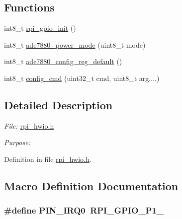 \subsection*{Functions}
\begin{DoxyCompactItemize}
\item 
int8\-\_\-t \hyperlink{a00005_ga156b48448f55534a2f9c805a1f760efa}{rpi\-\_\-gpio\-\_\-init} ()
\begin{DoxyCompactList}\small\item\em 

 \end{DoxyCompactList}\item 
int8\-\_\-t \hyperlink{a00005_gae9a5abd4e5054e7ea3f149b1764f2cd0}{ade7880\-\_\-power\-\_\-mode} (uint8\-\_\-t mode)
\begin{DoxyCompactList}\small\item\em 

 \end{DoxyCompactList}\item 
int8\-\_\-t \hyperlink{a00005_ga7782772c18e6ea515dcd28dcaedd0f06}{ade7880\-\_\-config\-\_\-reg\-\_\-default} ()
\begin{DoxyCompactList}\small\item\em 

 \end{DoxyCompactList}\item 
int8\-\_\-t \hyperlink{a00005_ga369ee0e8379941cbc2c79b90ec3292da}{config\-\_\-cmd} (uint32\-\_\-t cmd, uint8\-\_\-t arg,...)
\begin{DoxyCompactList}\small\item\em 

 \end{DoxyCompactList}\end{DoxyCompactItemize}


\subsection{Detailed Description}
{\itshape File\-:} \hyperlink{a00039}{rpi\-\_\-hwio.\-h} \par
 {\itshape Purpose\-:} \par
 

Definition in file \hyperlink{a00039_source}{rpi\-\_\-hwio.\-h}.



\subsection{Macro Definition Documentation}
\hypertarget{a00039_a99ed780c4dd8d2e01c5ff66064306abf}{
\subsubsection[{P\-I\-N\-\_\-\-I\-R\-Q0}]{\setlength{\rightskip}{0pt plus 5cm}\#define P\-I\-N\-\_\-\-I\-R\-Q0~R\-P\-I\-\_\-\-G\-P\-I\-O\-\_\-\-P1\-\_}}\label{d3/de7/a00039_a99ed780c4dd8d2e01c5ff66064306abf}


